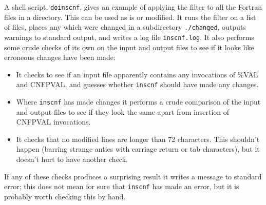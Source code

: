 \documentclass[twoside,11pt]{article}
\renewcommand{\_}{\texttt{\symbol{95}}}
\begin{document}
A shell script, {\tt do\_inscnf}, gives an example of applying the filter
to all the Fortran files in a directory.  This can be used as is
or modified.
It runs the filter on a list of files, places any which were changed
in a subdirectory {\tt ./changed}, outputs warnings to standard
output, and writes a log file {\tt inscnf.log}.
It also performs some crude checks of its own on the input and output
files to see if it looks like erroneous changes have been made:
\begin{itemize}
\item 
It checks to see if an input file apparently contains any invocations
of \%VAL and CNF\_PVAL, and guesses whether {\tt inscnf} 
should have made any changes.
\item
Where {\tt inscnf} has made changes it performs a crude comparison of
the input and output files to see if they look the same apart from
insertion of CNF\_PVAL invocations.
\item
It checks that no modified lines are longer than 72 characters.
This shouldn't happen (barring strange antics with carriage return
or tab characters), but it doesn't hurt to have another check.
\end{itemize}
If any of these checks produces a surprising result it writes a 
message to standard error; this does not mean for sure 
that {\tt inscnf} has made an error, 
but it is probably worth checking this by hand.








\end{document}
